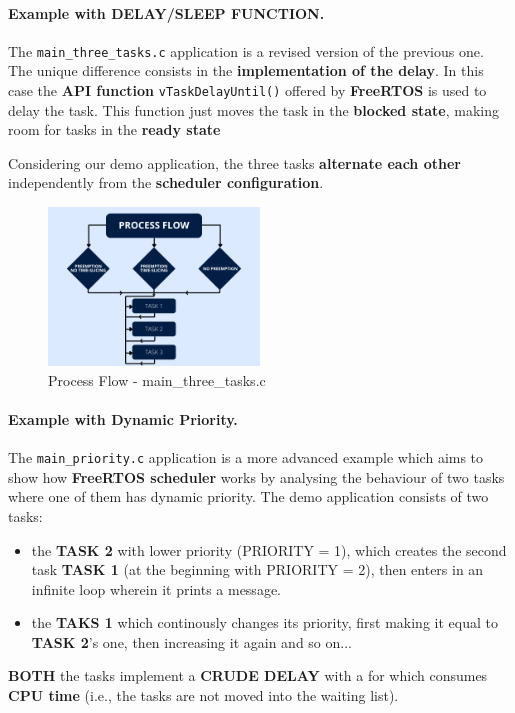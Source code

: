 \paragraph{Example with DELAY/SLEEP FUNCTION.} 
\label{par: Simple Example with DELAY/SLEEP FUNCTION} 
The \texttt{main\_three\_tasks.c} application is a revised version of the previous one. The unique difference consists in the \textbf{implementation of the delay}. In this case the \textbf{API function} \texttt{vTaskDelayUntil()} offered by \textbf{FreeRTOS} is used to delay the task. This function just moves the task in the \textbf{blocked state}, making room for tasks in the \textbf{ready state}

Considering our demo application, the three tasks \textbf{alternate each other} independently from the \textbf{scheduler configuration}.

\begin{figure}[H]
    \centering
    \includegraphics[width=0.5\textwidth]{img/three_tasks.png}
    \caption{Process Flow - main\_three\_tasks.c}
    \label{fig:Process Flow - vTaskDelayUntil}
\end{figure}

\paragraph{Example with Dynamic Priority.} 
\label{par: Simple Example with Dynamic Priority}
The \texttt{main\_priority.c} application is a more advanced example which aims to show how \textbf{FreeRTOS scheduler} works by analysing the behaviour of two tasks where one of them has dynamic priority.
The demo application consists of two tasks:
\begin{itemize}
    \item the \textbf{TASK 2} with lower priority (PRIORITY = 1), which creates the second task \textbf{TASK 1} (at the beginning with PRIORITY = 2), then enters in an infinite loop wherein it prints a message.
    \item the \textbf{TAKS 1} which continously changes its priority, first making it equal to \textbf{TASK 2}'s one, then increasing it again and so on...
\end{itemize}
\textbf{BOTH} the tasks implement a \textbf{CRUDE DELAY} with a for which consumes \textbf{CPU time} (i.e., the tasks are not moved into the waiting list).

